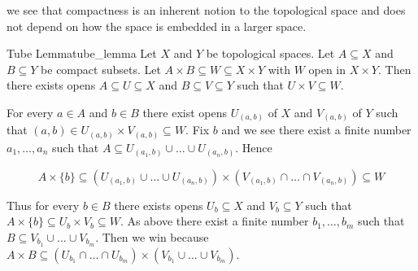 \documentclass{report}
\begin{document}
we see that compactness is an inherent notion to the topological space and does not depend on how the space is embedded in a larger space.

\begin{lemma}{Tube Lemma}{tube_lemma}
	 Let $X$ and $Y$ be topological spaces. Let $A \subseteq X$ and $B \subseteq Y$ be compact subsets. Let $A \times B \subseteq W \subseteq X \times Y$ with $W$ open in $X \times Y$. Then there exists opens $A \subseteq U \subseteq X$ and $B \subseteq V \subseteq Y$ such that $U \times V \subseteq W$.
\end{lemma}
\begin{prf}
	For every $a \in A$ and $b \in B$ there exist opens $U_{(a, b)}$ of $X$ and $V_{(a, b)}$ of $Y$ such that $(a, b) \in U_{(a, b)} \times V_{(a, b)} \subseteq W$. Fix $b$ and we see there exist a finite number $a_1, \ldots, a_n$ such that $A \subseteq U_{\left(a_1, b\right)} \cup \ldots \cup U_{\left(a_n, b\right)}$. Hence

$$
A \times\{b\} \subseteq \left(U_{\left(a_1, b\right)} \cup \ldots \cup U_{\left(a_n, b\right)}\right) \times\left(V_{\left(a_1, b\right)} \cap \ldots \cap V_{\left(a_n, b\right)}\right) \subseteq W
$$


Thus for every $b \in B$ there exists opens $U_b \subseteq X$ and $V_b \subseteq Y$ such that $A \times\{b\} \subseteq U_b \times V_b \subseteq W$. As above there exist a finite number $b_1, \ldots, b_m$ such that $B \subseteq V_{b_1} \cup \ldots \cup V_{b_m}$. Then we win because $A \times B \subseteq \left(U_{b_1} \cap \ldots \cap U_{b_m}\right) \times\left(V_{b_1} \cup \ldots \cup V_{b_m}\right)$.
\end{prf}
\end{document}
